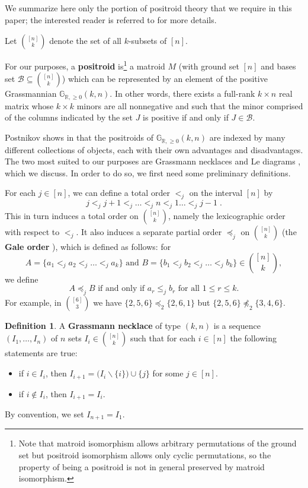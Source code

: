 \documentclass[11pt]{article}
\newcommand{\R}{\mathbb{R}}
\newcommand{\Gr}{\mathbb{G}_{\R, \geq 0}}
\newcommand{\cB}{\mathcal{B}}
\newcommand{\gale}[1]{\preccurlyeq_{#1}}
\theoremstyle{remark}
\theoremstyle{definition}
\newtheorem{dfn}[thm]{Definition}
\begin{document}
We summarize here only the portion of positroid theory that we require in this paper; the interested reader is referred to \cite[sections 6, 16]{Postnikov} for more details. 

Let $\binom{[n]}{k}$ denote the set of all $k$-subsets of $[n]$.  

For our purposes, a {\bf positroid} is\footnote{Note that matroid isomorphism allows arbitrary permutations of the ground set but positroid isomorphism allows only cyclic permutations, so the property of being a positroid is not in general preserved by matroid isomorphism.} a matroid $M$ (with ground set $[n]$ and bases set $\cB \subseteq \binom{[n]}{k}$) which can be represented by an element of the positive Grassmannian $\Gr(k,n)$. In other words, there exists a full-rank $k\times n$ real matrix whose $k\times k$ minors are all nonnegative and such that the minor comprised of the columns indicated by the set $J$ 
is positive if and only if $J \in \cB$.

Postnikov shows in \cite{Postnikov} that the positroids of $\Gr(k,n)$ are indexed by many different collections of objects, each with their own advantages and disadvantages. The two most suited to our purposes are Grassmann necklaces \cite[section 16]{Postnikov} and Le diagrams \cite[section 6]{Postnikov}, which we discuss. In order to do so, we first need some preliminary definitions.

For each $j \in [n]$, we can define a total order $<_j$ on the interval $[n]$ by
\[ j <_j j+1 <_j \dots <_j n <_j 1 \dots <_j j-1\;.\]
This in turn induces a total order on $\binom{[n]}{k}$, namely the lexicographic order with respect to $<_j$.  It also induces a separate partial order $\gale{j}$ on $\binom{[n]}{k}$ (the {\bf Gale order} \cite{Gale}), which is defined as follows: for 
\[A = \{a_1 <_j a_2 <_j \dots <_j a_k\} \text{ and } B = \{b_1 <_j b_2 <_j \dots <_j b_k\} \in \binom{[n]}{k},\] we define
\[A \gale{j} B \text{ if and only if } a_r \leq_j b_r \text{ for all }1 \leq r \leq k.\]
For example, in $\binom{[6]}{3}$ we have $\{2,5,6\}\gale{2} \{2,6,1\}$ but $\{2,5,6\}\not\gale{2}\{3,4,6\}$.


\begin{dfn}\label{def:grassmann necklace}
A {\bf Grassmann necklace} of type $(k,n)$ is a sequence $(I_1, \dots, I_n)$ of $n$ sets $I_i \in \binom{[n]}{k}$ such that for each $i \in [n]$ the following statements are true:
\begin{itemize}
\item if $i \in I_i$, then $I_{i+1} = \big(I_i \backslash \{i\}\big) \cup \{j\}$ for some $j \in[n]$.
\item if $i \not\in I_i$, then $I_{i+1} = I_i$.
\end{itemize}
By convention, we set $I_{n+1} = I_1$.
\end{dfn}
\end{document}
